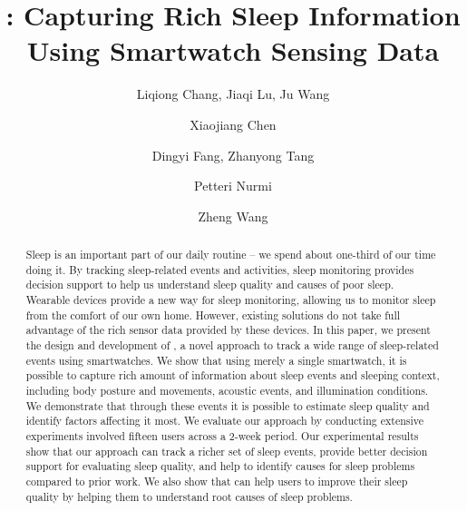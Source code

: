 \documentclass[acmlarge]{acmart}
\begin{document}
\title{\systemname: Capturing Rich Sleep Information Using Smartwatch Sensing Data}

\author{Liqiong Chang, Jiaqi Lu, Ju Wang}
\author{Xiaojiang Chen}
\author{Dingyi Fang, Zhanyong Tang}
 

\author{Petteri Nurmi}
 

\author{Zheng Wang}
 


\begin{abstract}
Sleep is an important part of our daily routine -- we spend about one-third of our time doing it. By tracking sleep-related events and activities, sleep monitoring provides decision support to help us understand sleep quality and  causes of poor sleep. Wearable devices provide a new way for sleep monitoring, allowing us to monitor sleep from the comfort of our own home. However, existing  solutions do not take full advantage of the rich sensor data provided by these devices. In this paper, we present the design and development of {\systemname}, a novel approach to track a wide range of sleep-related events using smartwatches. We show that using merely a single smartwatch, it is possible to capture rich amount of information about sleep events and sleeping context, including body posture and movements, acoustic events, and illumination conditions. We demonstrate that through these events it is possible to estimate sleep quality and identify factors affecting it most. We evaluate our approach by conducting extensive experiments involved fifteen users across a 2-week period. Our experimental results show that our approach can track a richer set of sleep events, provide better decision support for evaluating sleep quality, and help to identify causes for sleep problems compared to prior work. We also show that {\systemname} can help users to improve their sleep quality by helping them to understand root causes of sleep problems.
\end{abstract}
\end{document}

